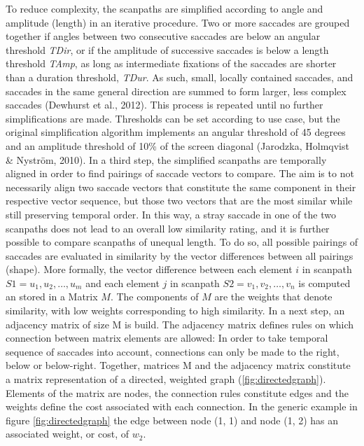 \documentclass[a4paper, 11pt]{scrreprt}
\begin{document}
To reduce complexity, the scanpaths are simplified according to angle and amplitude (length) in an iterative procedure. Two or more saccades are grouped together if angles between two consecutive saccades are below an angular threshold \textit{TDir}, or if the amplitude of successive saccades is below a length threshold \textit{TAmp}, as long as intermediate fixations of the saccades are shorter than a duration threshold, \textit{TDur}. As such, small, locally contained saccades, and saccades in the same general direction are summed to form larger, less complex saccades (Dewhurst et al., 2012). This process is repeated until no further simplifications are made. Thresholds can be set according to use case, but the original simplification algorithm implements an angular threshold of 45 degrees and an amplitude threshold of 10\% of the screen diagonal (Jarodzka, Holmqvist \& Nyström, 2010). \newline
In a third step, the simplified scanpaths are temporally aligned in order to find pairings of saccade vectors to compare. The aim is to not necessarily align two saccade vectors that constitute the same component in  their respective vector sequence, but those two vectors that are the most similar while still preserving temporal order. In this way, a stray saccade in one of the two scanpaths does not lead to an overall low similarity rating, and it is further possible to compare scanpaths of unequal length.  To do so, all possible pairings of saccades are evaluated in similarity by the vector differences between all pairings (shape). More formally, the vector difference between each element $i$ in scanpath $S1 = {u_1, u_2, \ldots, u_m}$ and each element $j$ in scanpath $S2 = {v_1, v_2, \ldots, v_n}$ is computed an stored in a Matrix $M$. The components of $M$ are the weights that denote similarity, with low weights corresponding to high similarity. In a next step, an adjacency matrix of size M is build. The adjacency matrix defines rules on which connection between matrix elements are allowed: In order to take temporal sequence of saccades into account, connections can only be made to the right, below or below-right. Together, matrices M and the adjacency matrix constitute a matrix representation of a directed, weighted graph (\ref{fig:directedgraph}). Elements of the matrix are nodes, the connection rules constitute edges and the weights define the cost associated with each connection. 
In the generic example in figure \ref{fig:directedgraph} the edge between node (1, 1) and node (1, 2) has an associated weight, or cost, of $w_2$. 
\end{document}
